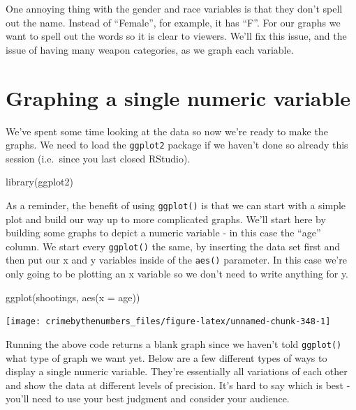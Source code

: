 \documentclass[
]{krantz}
\makeatletter
\newenvironment{Shaded}{\begin{snugshade}}{\end{snugshade}}
\newcommand{\AttributeTok}[1]{\textcolor[rgb]{0.61,0.61,0.61}{#1}}
\newcommand{\FunctionTok}[1]{\textcolor[rgb]{0,0,0}{#1}}
\newcommand{\NormalTok}[1]{#1}
\newenvironment{kframe}{%
\medskip{}
\setlength{\fboxsep}{.8em}
 \def\at@end@of@kframe{}%
 \ifinner\ifhmode%
  \def\at@end@of@kframe{\end{minipage}}%
  \begin{minipage}{\columnwidth}%
 \fi\fi%
 \def\FrameCommand##1{\hskip\@totalleftmargin \hskip-\fboxsep
 \colorbox{shadecolor}{##1}\hskip-\fboxsep
     \hskip-\linewidth \hskip-\@totalleftmargin \hskip\columnwidth}%
 \MakeFramed {\advance\hsize-\width
   \@totalleftmargin\z@ \linewidth\hsize
   \@setminipage}}%
 {\par\unskip\endMakeFramed%
 \at@end@of@kframe}
\renewenvironment{Shaded}{\begin{kframe}}{\end{kframe}}
\makeatother
\begin{document}
One annoying thing with the gender and race variables is
that they don't spell out the name. Instead of ``Female'',
for example, it has ``F''. For our graphs we want to spell
out the words so it is clear to viewers. We'll fix this
issue, and the issue of having many weapon categories, as we
graph each variable.

\hypertarget{graphing-a-single-numeric-variable}{%
\section{Graphing a single numeric
variable}\label{graphing-a-single-numeric-variable}}

We've spent some time looking at the data so now we're ready
to make the graphs. We need to load the \texttt{ggplot2}
package if we haven't done so already this session
(i.e.~since you last closed RStudio).

\begin{Shaded}
\begin{Highlighting}[]
\FunctionTok{library}\NormalTok{(ggplot2)}
\end{Highlighting}
\end{Shaded}

As a reminder, the benefit of using \texttt{ggplot()} is
that we can start with a simple plot and build our way up to
more complicated graphs. We'll start here by building some
graphs to depict a numeric variable - in this case the
``age'' column. We start every \texttt{ggplot()} the same,
by inserting the data set first and then put our x and y
variables inside of the \texttt{aes()} parameter. In this
case we're only going to be plotting an x variable so we
don't need to write anything for y.

\begin{Shaded}
\begin{Highlighting}[]
\FunctionTok{ggplot}\NormalTok{(shootings, }\FunctionTok{aes}\NormalTok{(}\AttributeTok{x =}\NormalTok{ age))}
\end{Highlighting}
\end{Shaded}

\begin{center}\texttt{[image: crimebythenumbers\_files/figure-latex/unnamed-chunk-348-1]} \end{center}

Running the above code returns a blank graph since we
haven't told \texttt{ggplot()} what type of graph we want
yet. Below are a few different types of ways to display a
single numeric variable. They're essentially all variations
of each other and show the data at different levels of
precision. It's hard to say which is best - you'll need to
use your best judgment and consider your audience.
\end{document}
